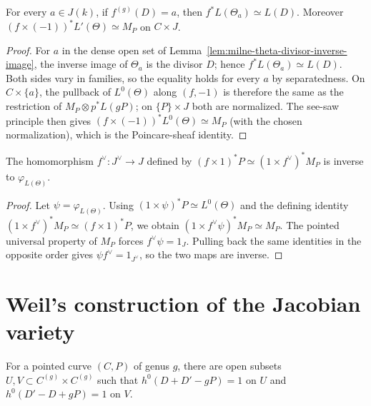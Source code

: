 \begin{lemma}\label{lem:milne-jacobian-poincare-comparison}
For every $a\in J(k)$, if $f^{(g)}(D)=a$, then $f^*L(\Theta_a)\simeq L(D)$. Moreover $(f\times(-1))^*L'(\Theta)\simeq M_P$ on $C\times J$.
\end{lemma}

\begin{proof}
For $a$ in the dense open set of Lemma~\ref{lem:milne-theta-divisor-inverse-image},
the inverse image of $\Theta_a$ is the divisor $D$; hence
$f^*L(\Theta_a)\simeq L(D)$.  Both sides vary in families, so the equality
holds for every $a$ by separatedness.  On $C\times\{a\}$, the pullback of
$L^0(\Theta)$ along $(f,-1)$ is therefore the same as the restriction of
$M_P\otimes p^*L(gP)$; on $\{P\}\times J$ both are normalized.  The
see-saw principle then gives
$(f\times(-1))^*L^0(\Theta)\simeq M_P$ (with the chosen normalization),
which is the Poincare-sheaf identity.
\end{proof}

\begin{lemma}\label{lem:milne-jacobian-autoduality-inverse}
The homomorphism $f^\vee:J^\vee\to J$ defined by $(f\times1)^*P\simeq(1\times f^\vee)^*M_P$ is inverse to $\varphi_{L(\Theta)}$.
\end{lemma}

\begin{proof}
Let $\psi=\varphi_{L(\Theta)}$.  Using
$(1\times\psi)^*P\simeq L^0(\Theta)$ and the defining identity
$(1\times f^\vee)^*M_P\simeq(f\times1)^*P$, we obtain
$(1\times f^\vee\psi)^*M_P\simeq M_P$.  The pointed universal property of
$M_P$ forces $f^\vee\psi=1_J$.  Pulling back the same identities in the
opposite order gives $\psi f^\vee=1_{J^\vee}$, so the two maps are inverse.
\end{proof}


\section{Weil's construction of the Jacobian variety}
\begin{lemma}\label{lem:milne-weil-generic-divisors}
For a pointed curve $(C,P)$ of genus $g$, there are open subsets $U,V\subset C^{(g)}\times C^{(g)}$ such that $h^0(D+D'-gP)=1$ on $U$ and $h^0(D'-D+gP)=1$ on $V$.
\end{lemma}

